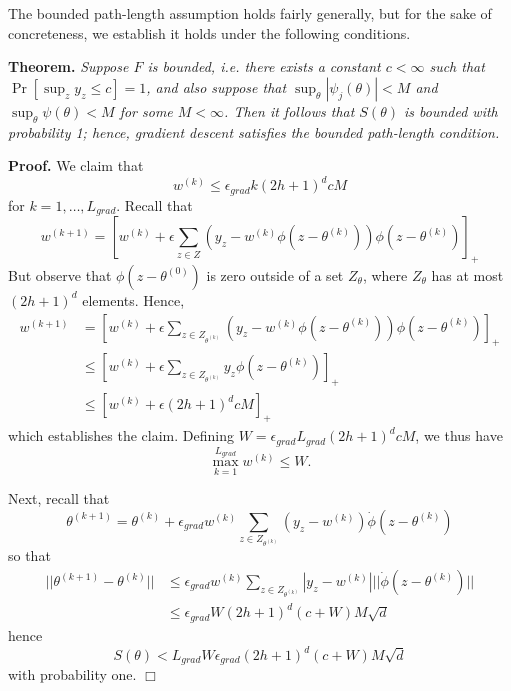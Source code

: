 \documentclass[11pt]{article}
\begin{document}
The bounded path-length assumption holds fairly generally, but for the sake of concreteness,
we establish it holds under the following conditions.


\textbf{Theorem. }\emph{
Suppose $F$ is bounded, i.e. there exists a constant $c < \infty$ such that $\Pr[\sup_z y_z \leq c] = 1$,
and also suppose that $\sup_\theta |\psi_j(\theta)| < M$ and $\sup_\theta \psi(\theta) < M$ for some $M < \infty$.
Then it follows that
$S(\theta)$ is bounded with probability 1;  hence, gradient
descent satisfies the bounded path-length condition.  }



\textbf{Proof.}
We claim that
\[
w^{(k)} \leq \epsilon_{grad} k (2h+1)^d cM
\]
for $k = 1,\hdots, L_{grad}$.
Recall that
\[
w^{(k+1)} = \left[w^{(k)} + \epsilon \sum_{z \in Z} (y_z - w^{(k)} \phi(z - \theta^{(k)})) \phi(z - \theta^{(k)})\right]_+
\]
But observe that $\phi(z - \theta^{(0)})$ is zero outside of a set $Z_{\theta}$, where $Z_\theta$ has at most $(2h + 1)^d$ elements.
Hence,
\begin{align*}
w^{(k+1)} &= \left[w^{(k)} + \epsilon \sum_{z \in Z_{\theta^{(k)}}} (y_z - w^{(k)} \phi(z - \theta^{(k)})) \phi(z - \theta^{(k)})\right]_+
\\&\leq \left[w^{(k)} + \epsilon \sum_{z \in Z_{\theta^{(k)}}} y_z \phi(z - \theta^{(k)})\right]_+
\\&\leq \left[w^{(k)} + \epsilon (2h+1)^d c M\right]_+
\end{align*}
which establishes the claim.
Defining $W = \epsilon_{grad} L_{grad} (2h+1)^d c M$, we thus have
\[
\max_{k=1}^{L_{grad}} w^{(k)} \leq W.
\]

Next, recall that
\[
\theta^{(k+1)} = \theta^{(k)} + \epsilon_{grad} w^{(k)} \sum_{z \in Z_{\theta^{(k)}}} (y_z - w^{(k)}) \dot{\phi}(z - \theta^{(k)})
\]
so that
\begin{align*}
||\theta^{(k+1)} - \theta^{(k)}|| &\leq \epsilon_{grad} w^{(k)} \sum_{z \in Z_{\theta^{(k)}}} |y_z - w^{(k)}| ||\dot{\phi}(z - \theta^{(k)})||
\\&\leq \epsilon_{grad} W (2h+1)^d (c + W) M\sqrt{d}
\end{align*}
hence
\[
S(\theta) < L_{grad} W \epsilon_{grad} (2h+1)^d (c + W) M\sqrt{d}
\]
with probability one. $\Box$
\end{document}
